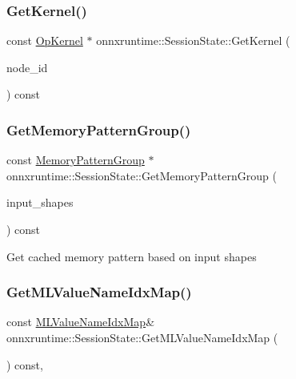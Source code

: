 \subsubsection{\texorpdfstring{Get\+Kernel()}{GetKernel()}}
{\footnotesize\ttfamily const \mbox{\hyperlink{classonnxruntime_1_1OpKernel}{Op\+Kernel}} $\ast$ onnxruntime\+::\+Session\+State\+::\+Get\+Kernel (\begin{DoxyParamCaption}\item[{\mbox{\hyperlink{namespaceonnxruntime_af8773b5c12b5d8fd9292eb2e268df760}{onnxruntime\+::\+Node\+Index}}}]{node\+\_\+id }\end{DoxyParamCaption}) const}

\mbox{\label{classonnxruntime_1_1SessionState_a66e34a4a6a9c5262f36a33e357122421}} 
\subsubsection{\texorpdfstring{Get\+Memory\+Pattern\+Group()}{GetMemoryPatternGroup()}}
{\footnotesize\ttfamily const \mbox{\hyperlink{structonnxruntime_1_1MemoryPatternGroup}{Memory\+Pattern\+Group}} $\ast$ onnxruntime\+::\+Session\+State\+::\+Get\+Memory\+Pattern\+Group (\begin{DoxyParamCaption}\item[{const std\+::vector$<$ \mbox{\hyperlink{classonnxruntime_1_1TensorShape}{Tensor\+Shape}} $>$ \&}]{input\+\_\+shapes }\end{DoxyParamCaption}) const}

Get cached memory pattern based on input shapes \mbox{\label{classonnxruntime_1_1SessionState_a0116cd101cba999d0795511cde756db9}} 
\subsubsection{\texorpdfstring{Get\+M\+L\+Value\+Name\+Idx\+Map()}{GetMLValueNameIdxMap()}\hspace{0.1cm}{\footnotesize\ttfamily [1/2]}}
{\footnotesize\ttfamily const \mbox{\hyperlink{classonnxruntime_1_1MLValueNameIdxMap}{M\+L\+Value\+Name\+Idx\+Map}}\& onnxruntime\+::\+Session\+State\+::\+Get\+M\+L\+Value\+Name\+Idx\+Map (\begin{DoxyParamCaption}{ }\end{DoxyParamCaption}) const\hspace{0.3cm}{\ttfamily [inline]}, {\ttfamily [noexcept]}}

